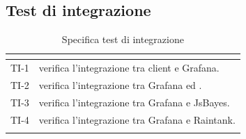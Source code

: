 \subsection{Test di integrazione}
\normalsize
\renewcommand{\arraystretch}{1}
\begin{longtable}{|C{2.5cm}|C{13cm}|}
	\hline
	\textbf{\color{title_text}{Test}} & \textbf{\color{title_text}{Specifica}}  \\
	\hline
	\endhead
	{TI-1} & verifica l'integrazione tra client e Grafana. \\
	\hline
	{TI-2} & verifica l'integrazione tra Grafana ed . \\
	\hline
	{TI-3} & verifica l'integrazione tra Grafana e JsBayes.\\
	\hline
	{TI-4} & verifica l'integrazione tra Grafana e Raintank. \\
	\hline
	\caption{Specifica test di integrazione}
	\label{tabella:specifica ti}
\end{longtable}
\renewcommand{\arraystretch}{1}
\newpage


